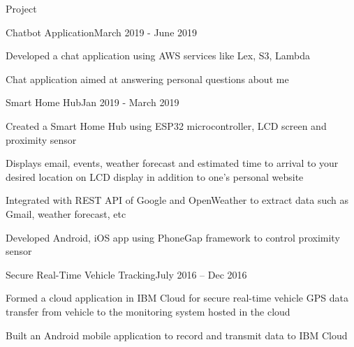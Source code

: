 \documentclass{resume} %
\newcommand{\tab}[1]{\hspace{.2667\textwidth}\rlap{#1}}
\newcommand{\itab}[1]{\hspace{0em}\rlap{#1}}
\begin{document}
\begin{rSection}{Project}

\begin{rSubsection}{Chatbot Application}{March 2019 - June 2019}{}{}
\item Developed a chat application using AWS services like Lex, S3, Lambda
    \item Chat application aimed at answering personal questions about me

\end{rSubsection}

\begin{rSubsection}{Smart Home Hub}{Jan 2019 - March 2019}{}{}
\item Created a Smart Home Hub using ESP32 microcontroller, LCD screen and proximity sensor
    \item Displays email, events, weather forecast and estimated time to arrival to your desired location on LCD display in addition to one’s personal website
    \item Integrated with REST API of Google and OpenWeather to extract data such as Gmail, weather forecast, etc
    \item Developed Android, iOS app using PhoneGap framework to control proximity sensor

\end{rSubsection}

\begin{rSubsection}{Secure Real-Time Vehicle Tracking}{July 2016 – Dec 2016}{}{}
\item Formed a cloud application in IBM Cloud for secure real-time vehicle GPS data transfer from vehicle to the monitoring system hosted in the cloud
      \item Built an Android mobile application to record and transmit data to IBM Cloud

\end{rSubsection}


\end{rSection}

\end{document}
